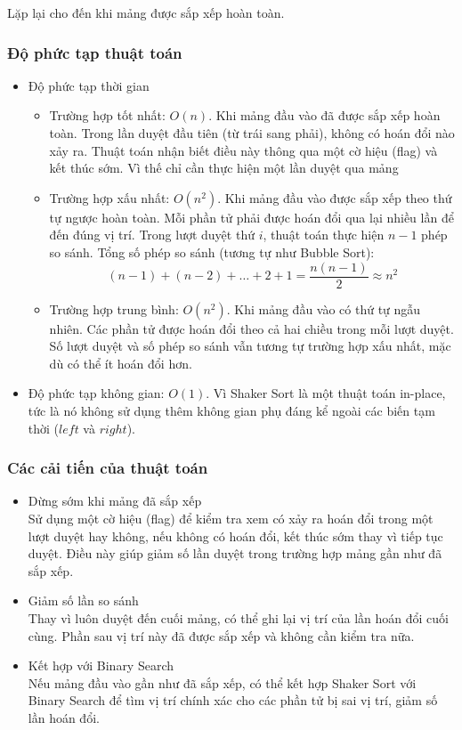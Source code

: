 Lặp lại cho đến khi mảng được sắp xếp hoàn toàn.

\subsubsection{Độ phức tạp thuật toán}

\begin{itemize}
	\item Độ phức tạp thời gian
	\begin{itemize}[label=$\circ$]
		\item Trường hợp tốt nhất: $O\left(n\right)$. Khi mảng đầu vào đã được sắp xếp hoàn toàn. Trong lần duyệt đầu tiên (từ trái sang phải), không có hoán đổi nào xảy ra. Thuật toán nhận biết điều này thông qua một cờ hiệu (flag) và kết thúc sớm. Vì thế chỉ cần thực hiện một lần duyệt qua mảng
		\item Trường hợp xấu nhất: $O\left(n^2\right)$. Khi mảng đầu vào được sắp xếp theo thứ tự ngược hoàn toàn. Mỗi phần tử phải được hoán đổi qua lại nhiều lần để đến đúng vị trí. Trong lượt duyệt thứ $i$, thuật toán thực hiện $n - 1$ phép so sánh.
		Tổng số phép so sánh (tương tự như Bubble Sort): 
		\begin{equation*}
			\left(n-1\right)+\left(n-2\right)+\ldots+2+1=\frac{n\left(n-1\right)}{2}\approx n^2
		\end{equation*}
		\item Trường hợp trung bình: $O\left(n^2\right)$. Khi mảng đầu vào có thứ tự ngẫu nhiên. Các phần tử được hoán đổi theo cả hai chiều trong mỗi lượt duyệt. Số lượt duyệt và số phép so sánh vẫn tương tự trường hợp xấu nhất, mặc dù có thể ít hoán đổi hơn.
	\end{itemize}
	\item Độ phức tạp không gian: $O\left(1\right)$. Vì Shaker Sort là một thuật toán in-place, tức là nó không sử dụng thêm không gian phụ đáng kể ngoài các biến tạm thời ($left$ và $right$).  
\end{itemize}

\subsubsection{Các cải tiến của thuật toán}

\begin{itemize}
	\item Dừng sớm khi mảng đã sắp xếp \\
	Sử dụng một cờ hiệu (flag) để kiểm tra xem có xảy ra hoán đổi trong một lượt duyệt hay không, nếu không có hoán đổi, kết thúc sớm thay vì tiếp tục duyệt. Điều này giúp giảm số lần duyệt trong trường hợp mảng gần như đã sắp xếp.
	\item Giảm số lần so sánh \\
	Thay vì luôn duyệt đến cuối mảng, có thể ghi lại vị trí của lần hoán đổi cuối cùng. Phần sau vị trí này đã được sắp xếp và không cần kiểm tra nữa.
	\item Kết hợp với Binary Search \\
	Nếu mảng đầu vào gần như đã sắp xếp, có thể kết hợp Shaker Sort với Binary Search để tìm vị trí chính xác cho các phần tử bị sai vị trí, giảm số lần hoán đổi.
\end{itemize}